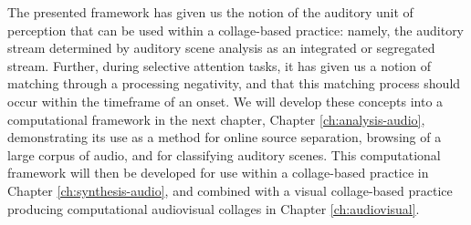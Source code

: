 \documentclass[a4paper,10pt,final]{ThesisStyle}
\begin{document}
The presented framework has given us the notion of the auditory unit of perception that can be used within a collage-based practice: namely, the auditory stream determined by auditory scene analysis as an integrated or segregated stream.  Further, during selective attention tasks, it has given us a notion of matching through a processing negativity, and that this matching process should occur within the timeframe of an onset.  We will develop these concepts into a computational framework in the next chapter, Chapter \ref{ch:analysis-audio}, demonstrating its use as a method for online source separation, browsing of a large corpus of audio, and for classifying auditory scenes.  This computational framework will then be developed for use within a collage-based practice in Chapter \ref{ch:synthesis-audio}, and combined with a visual collage-based practice producing computational audiovisual collages in Chapter \ref{ch:audiovisual}.




\end{document}
